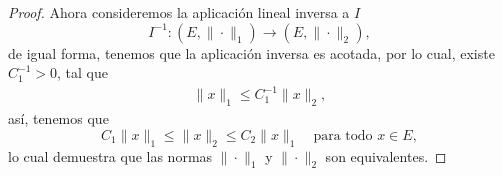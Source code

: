 \begin{enumerate}
\begin{proof}
Ahora consideremos la aplicación lineal inversa a $I$
\[
I^{-1} : (E, \| \cdot \|_1) \longrightarrow (E, \| \cdot \|_2),
\]
de igual forma, tenemos que la aplicación inversa es acotada, por lo cual, existe $C_1^{-1}>0$, tal que 
\begin{align*}
    \|x\|_1 \leq C_1^{-1} \|x\|_2
,\end{align*}
así, tenemos que 
\[
C_1 \|x\|_1 \leq \|x\|_2 \leq C_2 \|x\|_1 \quad \text{para todo } x \in E,
\]
lo cual demuestra que las normas \( \| \cdot \|_1 \) y \( \| \cdot \|_2 \) son equivalentes.




\end{proof}
\end{enumerate}
